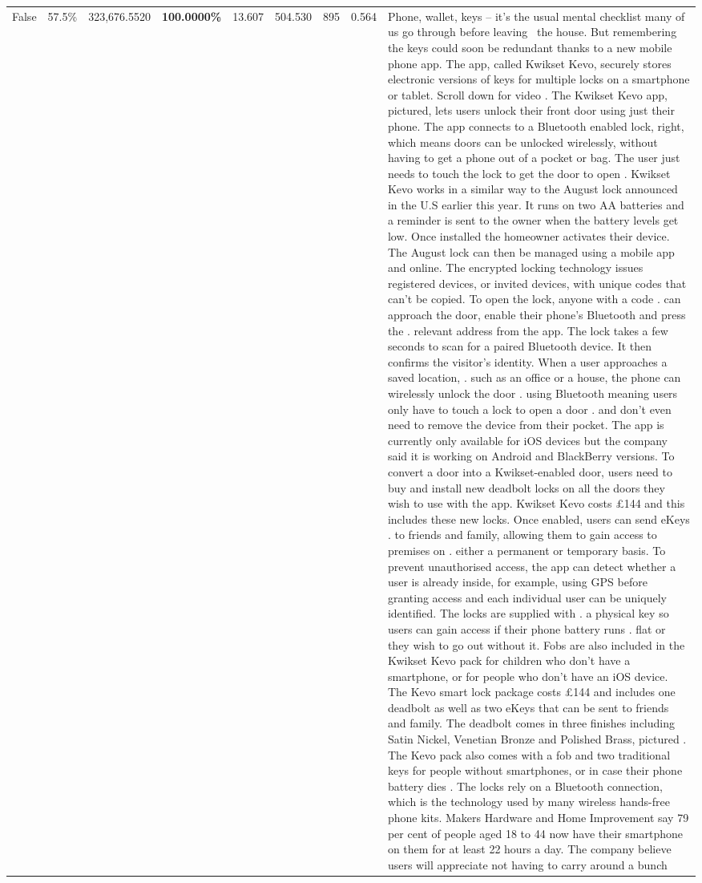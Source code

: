 \begin{table}[H]
\begin{tabular}{lllrlllll}
False & 57.5\% & 323,676.5520 & \bfseries \color{red} 100.0000\% & 13.607 & 504.530 & 895 & 0.564 & Phone, wallet, keys – it’s the usual mental checklist many of us go through before leaving  the house. But remembering the keys could soon be redundant thanks to a new mobile phone app. The app, called Kwikset Kevo, securely stores electronic versions of keys for multiple locks on a smartphone or tablet. Scroll down for video . The Kwikset Kevo app, pictured, lets users unlock their front door using just their phone. The app connects to a Bluetooth enabled lock, right, which means doors can be unlocked wirelessly, without having to get a phone out of a pocket or bag. The user just needs to touch the lock to get the door to open . Kwikset Kevo works in a similar way to the August lock announced in the U.S earlier this year. It runs on two AA batteries and a reminder is sent to the owner when the battery levels get low. Once installed the homeowner activates their device. The August lock can then be managed using a mobile app and online. The encrypted locking technology issues registered devices, or invited devices, with unique codes that can't be copied. To open the lock, anyone with a code . can approach the door, enable their phone's Bluetooth and press the . relevant address from the app. The lock takes a few seconds to scan for a paired Bluetooth device. It then confirms the visitor's identity. When a user approaches a saved location, . such as an office or a house, the phone can wirelessly unlock the door . using Bluetooth meaning users only have to touch a lock to open a door . and don't even need to remove the device from their pocket. The app is currently only available for iOS devices but the company said it is working on Android and BlackBerry versions. To convert a door into a Kwikset-enabled door, users need to buy and install new deadbolt locks on all the doors they wish to use with the app. Kwikset Kevo costs £144 and this includes these new locks. Once enabled, users can send eKeys . to friends and family, allowing them to gain access to premises on . either a permanent or temporary basis. To prevent unauthorised access, the app can detect whether a user is already inside, for example, using GPS before granting access and each individual user can be uniquely identified. The locks are supplied with . a physical key so users can gain access if their phone battery runs . flat or they wish to go out without it. Fobs are also included in the Kwikset Kevo pack for children who don't have a smartphone, or for people who don't have an iOS device. The Kevo smart lock package costs £144 and includes one deadbolt as well as two eKeys that can be sent to friends and family. The deadbolt comes in three finishes including Satin Nickel, Venetian Bronze and Polished Brass, pictured . The Kevo pack also comes with a fob and two traditional keys for people without smartphones, or in case their phone battery dies . The locks rely on a Bluetooth connection, which is the technology used by many wireless hands-free phone kits. Makers Hardware and Home Improvement say 79 per cent of people aged 18 to 44 now have their smartphone on them for at least 22 hours a day. The company believe users will appreciate not having to carry around a bunch 
\end{tabular}
\end{table}
